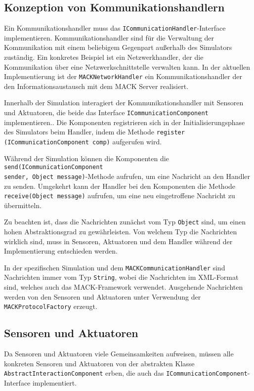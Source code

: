 \subsection{Konzeption von Kommunikationshandlern}\label{subsec:concept_communication}
Ein Kommunikationshandler muss das \texttt{ICommunicationHandler}-Interface implementieren. Kommunikationshandler sind für die Verwaltung der Kommunikation mit einem beliebigem Gegenpart außerhalb des Simulators zuständig. Ein konkretes Beispiel ist ein Netzwerkhandler, der die Kommunikation über eine Netzwerkschnittstelle verwalten kann. In der aktuellen Implementierung ist der \texttt{MACKNetworkHandler} ein Kommunikationshandler der den Informationsaustausch mit dem MACK Server realisiert.

Innerhalb der Simulation interagiert der Kommunikationshandler mit Sensoren und Aktuatoren, die beide das Interface \texttt{ICommunicationComponent} implementieren.. Die Komponenten registrieren sich in der Initialisierungsphase des Simulators beim Handler, indem die Methode \texttt{re\-gister (ICommunication\-Component comp)} aufgerufen wird.

Während der Simulation können die Komponenten die \texttt{send(ICommunication\-Component\\
sender, Object message)}-Methode aufrufen, um eine Nachricht an den Handler zu senden. Umgekehrt kann der Handler bei den Komponenten die Methode \texttt{receive(Object message)} aufrufen, um eine neu eingetroffene Nachricht zu übermitteln.

Zu beachten ist, dass die Nachrichten zunächst vom Typ \texttt{Object} sind, um einen hohen Abstraktionsgrad zu gewährleisten. Von welchem Typ die Nachrichten wirklich sind, muss in Sensoren, Aktuatoren und dem Handler während der Implementierung entschieden werden.

In der spezifischen Simulation und dem \texttt{MACKCommunicationHandler} sind Nachrichten immer vom Typ \texttt{String}, wobei die Nachrichten im XML-Format sind, welches auch das MACK-Framework verwendet. Ausgehende Nachrichten werden von den Sensoren und Aktuatoren unter Verwendung der \texttt{MACKProtocolFactory} erzeugt.


\subsection{Sensoren und Aktuatoren}\label{subsec:concept_actuators_sensors}
Da Sensoren und Aktuatoren viele Gemeinsamkeiten aufweisen, müssen alle konkreten Sensoren und Aktuatoren von der abstrakten Klasse \texttt{AbstractInteractionComponent} erben, die auch das \texttt{ICommunication\-Component}-Interface implementiert.

